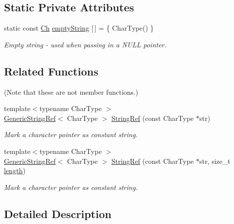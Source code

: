 \subsection*{Static Private Attributes}
\begin{DoxyCompactItemize}
\item 
static const \hyperlink{structGenericStringRef_a16908c3fce41be380061330c14ba2140}{Ch} \hyperlink{structGenericStringRef_aeb7a469eea3ca2a9fd9fcb2e33df4a6c}{empty\+String} \mbox{[}$\,$\mbox{]} = \{ Char\+Type() \}
\begin{DoxyCompactList}\small\item\em Empty string -\/ used when passing in a N\+U\+LL pointer. \end{DoxyCompactList}\end{DoxyCompactItemize}
\subsection*{Related Functions}
(Note that these are not member functions.) \begin{DoxyCompactItemize}
\item 
{\footnotesize template$<$typename Char\+Type $>$ }\\\hyperlink{structGenericStringRef}{Generic\+String\+Ref}$<$ Char\+Type $>$ \hyperlink{structGenericStringRef_aa6b9fd9f6aa49405a574c362ba9af6b5}{String\+Ref} (const Char\+Type $\ast$str)
\begin{DoxyCompactList}\small\item\em Mark a character pointer as constant string. \end{DoxyCompactList}\item 
{\footnotesize template$<$typename Char\+Type $>$ }\\\hyperlink{structGenericStringRef}{Generic\+String\+Ref}$<$ Char\+Type $>$ \hyperlink{structGenericStringRef_a578c51ab574a50a9c760b9da7c7562f2}{String\+Ref} (const Char\+Type $\ast$str, size\+\_\+t \hyperlink{imgui__impl__opengl3__loader_8h_a011fc24f10426c01349e94a4edd4b0d5}{length})
\begin{DoxyCompactList}\small\item\em Mark a character pointer as constant string. \end{DoxyCompactList}\end{DoxyCompactItemize}


\subsection{Detailed Description}
